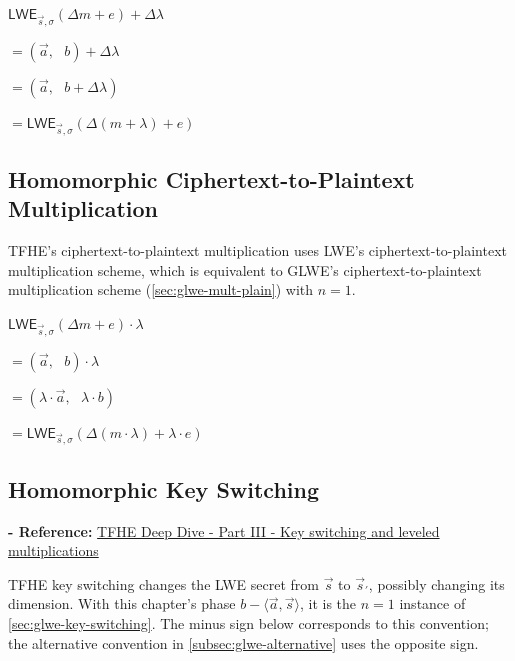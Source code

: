 \begin{tcolorbox}[title={\textbf{\tboxlabel{\ref*{subsec:tfhe-add-plain}} TFHE Ciphertext-to-Plaintext Addition}}]
$\textsf{LWE}_{\vec{s}, \sigma}(\Delta m + e) + \Delta \lambda $

$=  (\vec{a}, \text{ } b) + \Delta \lambda$

$=  (\vec{a}, \text{ } b + \Delta\lambda)$

$= \textsf{LWE}_{\vec{s}, \sigma}(\Delta (m + \lambda) + e )$
\end{tcolorbox}


\subsection{Homomorphic Ciphertext-to-Plaintext Multiplication}
\label{subsec:tfhe-mult-plain}

TFHE's ciphertext-to-plaintext multiplication uses LWE's ciphertext-to-plaintext multiplication scheme, which is equivalent to GLWE's ciphertext-to-plaintext multiplication scheme (\autoref{sec:glwe-mult-plain}) with $n = 1$.  

\begin{tcolorbox}[title={\textbf{\tboxlabel{\ref*{subsec:tfhe-mult-plain}} TFHE Ciphertext-to-Plaintext Multiplication}}]
$\textsf{LWE}_{\vec{s}, \sigma}(\Delta m + e) \cdot \lambda$

$= (\vec{a}, \text{ } b) \cdot \lambda$

$= (\lambda\cdot \vec{a}, \text{ } \lambda \cdot b)$

$= \textsf{LWE}_{\vec{s}, \sigma}(\Delta (m \cdot \lambda) + \lambda \cdot e )$
\end{tcolorbox}


\subsection{Homomorphic Key Switching}
\label{subsec:tfhe-key-switching}

\textbf{- Reference:} 
\href{https://www.zama.ai/post/tfhe-deep-dive-part-3}{TFHE Deep Dive - Part III - Key switching and leveled multiplications}~\cite{tfhe-3}

TFHE key switching changes the LWE secret from $\vec{s}$ to $\vec{s}_{'}$, possibly changing its dimension. With this chapter's phase $b-\langle\vec a,\vec s\rangle$, it is the $n=1$ instance of \autoref{sec:glwe-key-switching}. The minus sign below corresponds to this convention; the alternative convention in \autoref{subsec:glwe-alternative} uses the opposite sign.

